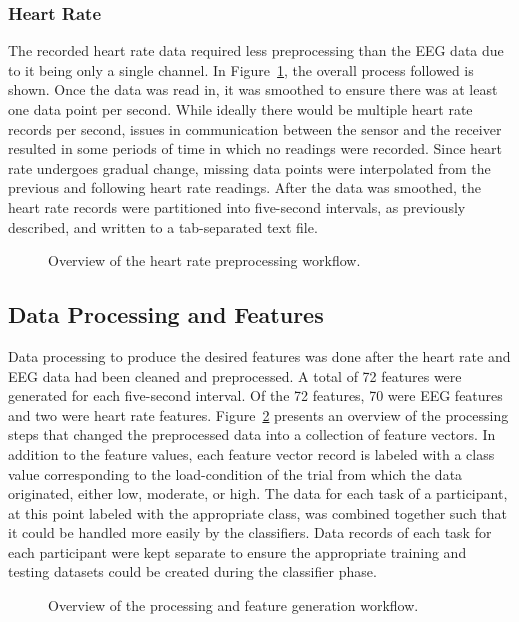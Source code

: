 \documentclass[11pt]{article}
\begin{document}
		\subsubsection{Heart Rate}
		The recorded heart rate data required less preprocessing than the EEG data due to it being only a single channel. In Figure~\ref{fig:heart-preprocessing}, the overall process followed is shown. Once the data was read in, it was smoothed to ensure there was at least one data point per second. While ideally there would be multiple heart rate records per second, issues in communication between the sensor and the receiver resulted in some periods of time in which no readings were recorded.  Since heart rate undergoes gradual change, missing data points were interpolated from the previous and following heart rate readings.  After the data was smoothed, the heart rate records were partitioned into five-second intervals, as previously described, and written to a tab-separated text file.  
		\begin{figure}
		\centering

		\caption{Overview of the heart rate preprocessing workflow.}
		\label{fig:heart-preprocessing}
		\end{figure} 
			
	\subsection{Data Processing and Features}
	Data processing to produce the desired features was done after the heart rate and EEG data had been cleaned and preprocessed. A total of 72 features were generated for each five-second interval. Of the 72 features, 70 were EEG features and two were heart rate features. Figure~\ref{fig:feature_generation} presents an overview of the processing steps that changed the preprocessed data into a collection of feature vectors. In addition to the feature values, each feature vector record is labeled with a class value corresponding to the load-condition of the trial from which the data originated, either low, moderate, or high. The data for each task of a participant, at this point labeled with the appropriate class, was combined together such that it could be handled more easily by the classifiers. Data records of each task for each participant were kept separate to ensure the appropriate training and testing datasets could be created during the classifier phase.
	\begin{figure}
	\centering

	\caption{Overview of the processing and feature generation workflow.}
	\label{fig:feature_generation}
	\end{figure} 
	
\end{document}
